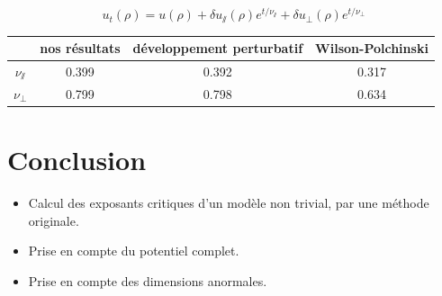 \documentclass[xcolor=dvipsnames]{beamer}
\begin{document}
\begin{frame}
\begin{columns}
\end{columns}

\[
u_t(\rho) = u(\rho) + \delta u_\sslash(\rho) e^{t/\nu_\sslash} + \delta u_\perp(\rho) e^{t/\nu_\perp}
\]

\begin{center}
\label{tab:results}
\begin{tabular}{|c|c|c|c|}
\hline 
\rule[-1ex]{0pt}{2.5ex} ~ & nos résultats & développement perturbatif & Wilson-Polchinski \\ 
\hline 
\rule[-1ex]{0pt}{2.5ex} $\nu_\sslash$ & 0.399 & 0.392 & 0.317 \\ 
\hline 
\rule[-1ex]{0pt}{2.5ex} $\nu_\perp$ & 0.799 & 0.798 & 0.634 \\ 
\hline 
\end{tabular} 
\end{center}


\end{frame}

\section{Conclusion}
\begin{frame}

\begin{itemize}
\item Calcul des exposants critiques d'un modèle non trivial, par une méthode originale.
\item Prise en compte du potentiel complet.
\item Prise en compte des dimensions anormales.
\end{itemize}

\end{frame}
\end{document}
